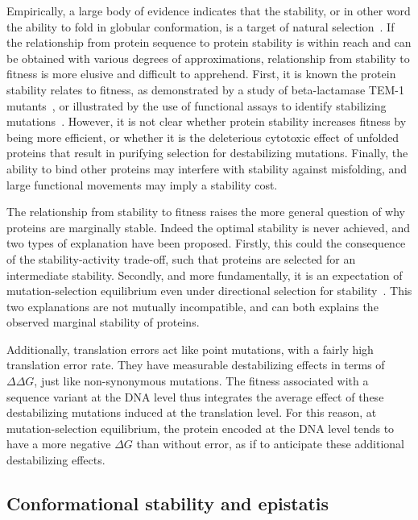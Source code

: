 Empirically, a large body of evidence indicates that the stability, or in other word the ability to fold in globular conformation, is a target of natural selection~\citep{Sikosek2014}.
If the relationship from protein sequence to protein stability is within reach and can be obtained with various degrees of approximations, relationship from stability to fitness is more elusive and difficult to apprehend.
First, it is known the protein stability relates to fitness, as demonstrated by a study of beta-lactamase TEM-1 mutants~\citep{Jacquier2013}, or illustrated by the use of functional assays to identify stabilizing mutations~\citep{Araya2012}.
However, it is not clear whether protein stability increases fitness by being more efficient, or whether it is the deleterious cytotoxic effect of unfolded proteins that result in purifying selection for destabilizing mutations.
Finally, the ability to bind other proteins may interfere with stability against misfolding, and large functional movements may imply a stability cost.

The relationship from stability to fitness raises the more general question of why proteins are marginally stable.
Indeed the optimal stability is never achieved, and two types of explanation have been proposed.
Firstly, this could the consequence of the stability-activity trade-off, such that proteins are selected for an intermediate stability.
Secondly, and more fundamentally, it is an expectation of mutation-selection equilibrium even under directional selection for stability~\citep{Taverna2002}.
This two explanations are not mutually incompatible, and can both explains the observed marginal stability of proteins.

Additionally, translation errors act like point mutations, with a fairly high translation error rate.
They have measurable destabilizing effects in terms of $\Delta \Delta G$, just like non-synonymous mutations.
The fitness associated with a sequence variant at the DNA level thus integrates the average effect of these destabilizing mutations induced at the translation level.
For this reason, at mutation-selection equilibrium, the protein encoded at the DNA level tends to have a more negative $\Delta G$ than without error, as if to anticipate these additional destabilizing effects.

\subsection{Conformational stability and epistatis}
\label{subsec:conformational-stability-and-epistatis}

